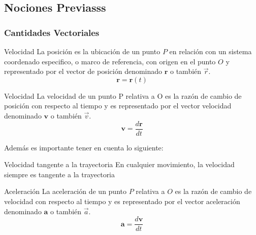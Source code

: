 \subsection{Nociones Previasss}
\subsubsection{Cantidades Vectoriales}
\begin{Theorem*}{Velocidad}
	La posición es la ubicación de un punto $ P $ en relación con un sistema coordenado especifico, o marco de referencia, con origen en el punto $ O $ y representado por el vector de posición denominado $ \mathbf{r} $ o también $ \vec{r} $.
	$$ \mathbf{r}=\mathbf{r}(t) $$
\end{Theorem*}
\begin{Theorem*}{Velocidad}
	La velocidad de un punto P relativa a O es la razón de cambio de posición con respecto al tiempo y es representado por el vector velocidad denominado $ \mathbf{v} $ o también $ \vec{v} $.
	$$ \mathbf{v}=\frac{d\mathbf{r}}{dt} $$
\end{Theorem*}
Además es importante tener en cuenta lo siguiente:
\begin{Theorem*}{Velocidad tangente a la trayectoria}
	En cualquier movimiento, la velocidad siempre es tangente a la trayectoria
\end{Theorem*}
\begin{Theorem*}{Aceleración}
	La aceleración de un punto $ P $ relativa a $ O $ es la razón de cambio de velocidad con respecto al tiempo y es representado por el vector aceleración denominado $ \mathbf{a} $ o también $ \vec{a} $.
	$$ \mathbf{a}=\frac{d\mathbf{v}}{dt} $$
\end{Theorem*}